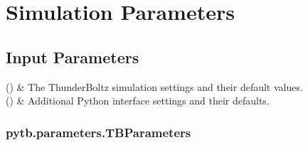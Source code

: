\documentclass[letterpaper,10pt,english,openany,oneside]{sphinxmanual}
\begin{document}
\sphinxstepscope


\section{Simulation Parameters}
\label{\detokenize{params:simulation-parameters}}\label{\detokenize{params::doc}}

\subsection{Input Parameters}
\label{\detokenize{params:input-parameters}}

\begin{savenotes}\sphinxattablestart
\sphinxthistablewithglobalstyle
\sphinxthistablewithnovlinesstyle
\centering
\begin{tabulary}{\linewidth}[t]{}
\sphinxtoprule
\sphinxtableatstartofbodyhook
\sphinxAtStartPar
{\hyperref[\detokenize{api/pytb.parameters.TBParameters:pytb.parameters.TBParameters}]{}}()
&
\sphinxAtStartPar
The ThunderBoltz simulation settings and their default values.
\\
\sphinxhline
\sphinxAtStartPar
{\hyperref[\detokenize{api/pytb.parameters.WrapParameters:pytb.parameters.WrapParameters}]{}}()
&
\sphinxAtStartPar
Additional Python interface settings and their defaults.
\\
\sphinxbottomrule
\end{tabulary}
\sphinxtableafterendhook\par
\sphinxattableend\end{savenotes}

\sphinxstepscope


\subsubsection{pytb.parameters.TBParameters}
\label{\detokenize{api/pytb.parameters.TBParameters:pytb-parameters-tbparameters}}\label{\detokenize{api/pytb.parameters.TBParameters::doc}}
\end{document}
